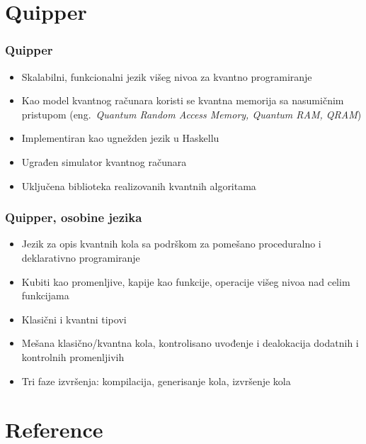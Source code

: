 \documentclass[12pt,hyperref={unicode}]{beamer}
\begin{document}
\section{Quipper}

\begin{frame}
\frametitle{Quipper}
\begin{itemize}
\item{Skalabilni, funkcionalni jezik višeg nivoa za kvantno programiranje \cite{p3}}
\item{Kao model kvantnog računara koristi se kvantna memorija sa nasumičnim pristupom (eng.~\emph{Quantum Random Access Memory, Quantum RAM, QRAM}})
\item{Implementiran kao ugnežden jezik u Haskellu}
\item{Ugrađen simulator kvantnog računara}
\item{Uključena biblioteka realizovanih kvantnih algoritama}
\end{itemize}
\end{frame}
\begin{frame}
\frametitle{Quipper, osobine jezika}
\begin{itemize}
\item{Jezik za opis kvantnih kola sa podrškom za pomešano proceduralno i deklarativno programiranje}
\item{Kubiti kao promenljive, kapije kao funkcije, operacije višeg nivoa nad celim funkcijama}
\item{Klasični i kvantni tipovi}
\item{Mešana klasično/kvantna kola, kontrolisano uvođenje i dealokacija dodatnih i kontrolnih promenljivih}
\item{Tri faze izvršenja: kompilacija, generisanje kola, izvršenje kola}
\end{itemize}
\end{frame}

\section{Reference}
\end{document}
